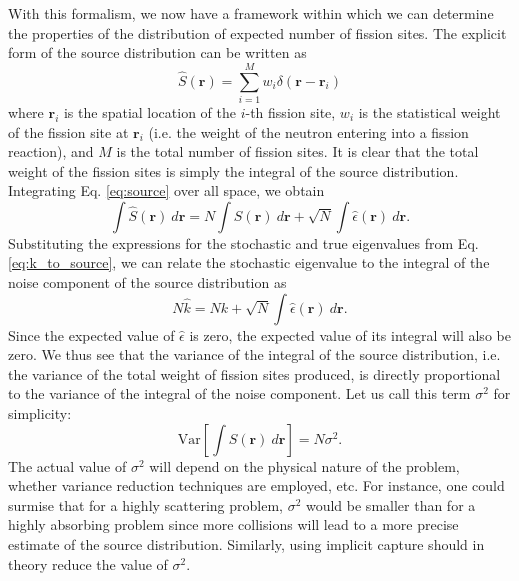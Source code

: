 \documentclass[11pt]{article}
\begin{document}
With this formalism, we now have a framework within which we can
determine the properties of the distribution of expected number of
fission sites. The explicit form of the source distribution can be
written as
\begin{equation}
  \hat{S}(\mathbf{r}) = \sum_{i=1}^{M} w_i \delta( \mathbf{r} -
  \mathbf{r}_i )
\end{equation}
where $\mathbf{r}_i$ is the spatial location of the $i$-th fission
site, $w_i$ is the statistical weight of the fission site at
$\mathbf{r}_i$ (i.e. the weight of the neutron entering into a fission
reaction), and $M$ is the total number of fission sites. It is clear
that the total weight of the fission sites is simply the integral of
the source distribution. Integrating Eq. \ref{eq:source} over all
space, we obtain
\begin{equation}
  \int \hat{S}(\mathbf{r}) \: d\mathbf{r} = N \int S(\mathbf{r}) \:
  d\mathbf{r} + \sqrt{N} \int \hat{\epsilon}(\mathbf{r}) \:
  d\mathbf{r} .
\end{equation}
Substituting the expressions for the stochastic and true eigenvalues
from Eq. \ref{eq:k_to_source}, we can relate the stochastic eigenvalue
to the integral of the noise component of the source distribution as
\begin{equation}
  N\hat{k} = Nk + \sqrt{N} \int \hat{\epsilon}(\mathbf{r}) \:
  d\mathbf{r}.
\end{equation}
Since the expected value of $\hat{\epsilon}$ is zero, the expected value of
its integral will also be zero. We thus see that the variance of the
integral of the source distribution, i.e. the variance of the total
weight of fission sites produced, is directly proportional to the
variance of the integral of the noise component. Let us call this term
$\sigma^2$ for simplicity:
\begin{equation}
  \text{Var} \left[ \int \hat{S}(\mathbf{r}) \: d\mathbf{r} \right ] =
  N \sigma^2.
\end{equation}
The actual value of $\sigma^2$ will depend on the physical nature of
the problem, whether variance reduction techniques are employed,
etc. For instance, one could surmise that for a highly scattering
problem, $\sigma^2$ would be smaller than for a highly absorbing
problem since more collisions will lead to a more precise estimate of
the source distribution. Similarly, using implicit capture should in
theory reduce the value of $\sigma^2$.
\end{document}
